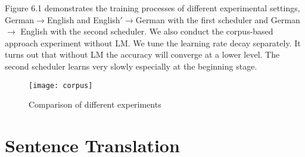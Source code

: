 Figure 6.1 demonstrates the training processes of different experimental settings, German$\rightarrow$English and English$'\rightarrow$German with the first scheduler and German$\rightarrow$ English with the second scheduler. We also conduct the corpus-based approach experiment without LM. We tune the learning rate decay separately. It turns out that without LM the accuracy will converge at a lower level. The second scheduler learns very slowly especially at the beginning stage. 
\begin{figure}[H]
	\texttt{[image: corpus]}
	\centering
	\caption{Comparison of different experiments}
\end{figure}


\section{Sentence Translation}


